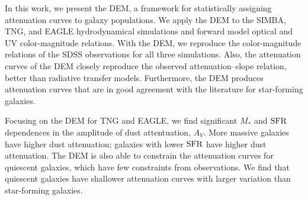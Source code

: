 

In this work, we present the DEM, a framework for statistically assigning
attenuation curves to galaxy populations. We apply the DEM to the SIMBA,
TNG, and EAGLE hydrodynamical simulations and forward model optical and UV
color-magnitude relations. %
With the DEM, we reproduce the color-magnitude relations of the SDSS
observations for all three simulations. Also, the attenuation curves of the DEM
closely reproduce the observed attenuation--slope relation, better than
radiative transfer models. Furthermore, the DEM produces attenuation curves
that are in good agreement with the literature for star-forming galaxies.

Focusing on the DEM for TNG and EAGLE, we find significant $M_*$ and ${\rm SFR}$
dependences in the amplitude of dust attentuation, $A_V$. More massive
galaxies have higher dust attenuation; galaxies with lower 
${\rm SFR}$ have  higher dust attenuation. The DEM is also able to constrain the
attenuation curves for quiescent galaxies, which have few constraints from
observations. We find that quiescent galaxies have shallower attenuation
curves with larger variation than star-forming galaxies.

